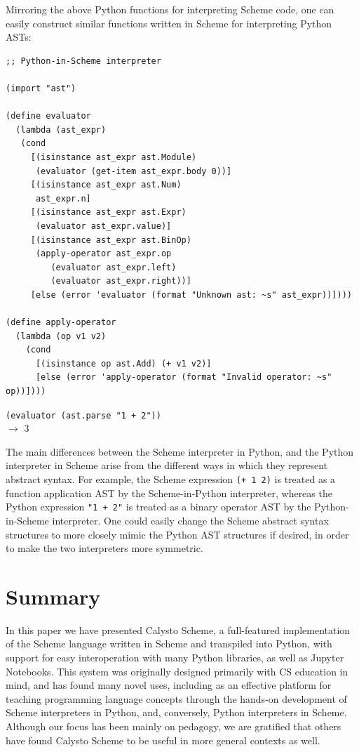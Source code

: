\documentclass[acmsmall,screen,nonacm]{acmart}
\begin{document}
Mirroring the above Python functions for interpreting Scheme code, one can
easily construct similar functions written in Scheme for interpreting Python
ASTs:\\

\begin{minipage}{\textwidth}
{\small
\begin{verbatim}
;; Python-in-Scheme interpreter

(import "ast")

(define evaluator
  (lambda (ast_expr)
   (cond
     [(isinstance ast_expr ast.Module)
      (evaluator (get-item ast_expr.body 0))]
     [(isinstance ast_expr ast.Num)
      ast_expr.n]
     [(isinstance ast_expr ast.Expr)
      (evaluator ast_expr.value)]
     [(isinstance ast_expr ast.BinOp)
      (apply-operator ast_expr.op
         (evaluator ast_expr.left)
         (evaluator ast_expr.right))]
     [else (error 'evaluator (format "Unknown ast: ~s" ast_expr))])))

(define apply-operator
  (lambda (op v1 v2)
    (cond
      [(isinstance op ast.Add) (+ v1 v2)]
      [else (error 'apply-operator (format "Invalid operator: ~s" op))])))

\end{verbatim}
\texttt{(evaluator (ast.parse "1 + 2"))}\\
$\rightarrow$ 3\\
}
\end{minipage}

\noindent
The main differences between the Scheme interpreter in Python, and the Python
interpreter in Scheme arise from the different ways in which they represent
abstract syntax.  For example, the Scheme expression \texttt{(+~1~2)} is
treated as a function application AST by the Scheme-in-Python interpreter,
whereas the Python expression \texttt{"1~+~2"} is treated as a binary operator
AST by the Python-in-Scheme interpreter.  One could easily change the Scheme
abstract syntax structures to more closely mimic the Python AST structures if
desired, in order to make the two interpreters more symmetric.

\section{Summary}

In this paper we have presented Calysto Scheme, a full-featured implementation
of the Scheme language written in Scheme and transpiled into Python, with
support for easy interoperation with many Python libraries, as well as Jupyter
Notebooks. This system was originally designed primarily with CS education in
mind, and has found many novel uses, including as an effective platform for
teaching programming language concepts through the hands-on development of
Scheme interpreters in Python, and, conversely, Python interpreters in
Scheme. Although our focus has been mainly on pedagogy, we are gratified that
others have found Calysto Scheme to be useful in more general contexts as well.
\end{document}
